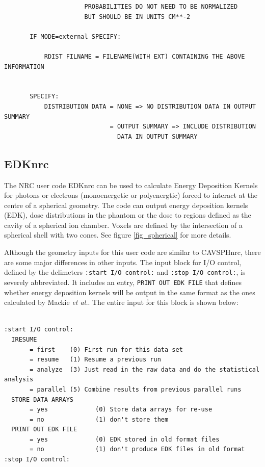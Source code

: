 \documentclass[12pt,twoside]{article}  %
\begin{document}
\begin{verbatim}
                      PROBABILITIES DO NOT NEED TO BE NORMALIZED
                      BUT SHOULD BE IN UNITS CM**-2

       IF MODE=external SPECIFY:

           RDIST FILNAME = FILENAME(WITH EXT) CONTAINING THE ABOVE INFORMATION


       SPECIFY:
           DISTRIBUTION DATA = NONE => NO DISTRIBUTION DATA IN OUTPUT SUMMARY
                             = OUTPUT SUMMARY => INCLUDE DISTRIBUTION
                               DATA IN OUTPUT SUMMARY
\end{verbatim}

\subsection{EDKnrc}

The NRC user code EDKnrc can be used to calculate Energy Deposition Kernels
for photons or electrons (monoenergetic or polyenergtic) forced to interact
at the centre of a spherical
geometry\cite{Ma05}.  The code can output energy deposition kernels (EDK),
dose distributions in the phantom or the dose to regions defined as the
cavity of a spherical ion chamber.  Voxels are defined by the intersection
of a spherical shell with two cones. See figure \ref{fig_spherical}
for more details.

Although the geometry inputs for this user code are similar to CAVSPHnrc,
there are some major differences in other inputs. The input block for I/O
control, defined by the delimeters {\tt :start I/O control:} and
{\tt:stop I/O control:}, is severely abbreviated.  It includes an entry,
{\tt PRINT OUT EDK FILE} that defines whether energy deposition
kernels will be output in the same format as the ones calculated by
Mackie {\it et al.}\cite{Ma88}. The entire input for this block
is shown below:

\begin{verbatim}

:start I/O control:
  IRESUME
       = first    (0) First run for this data set
       = resume   (1) Resume a previous run
       = analyze  (3) Just read in the raw data and do the statistical analysis
       = parallel (5) Combine results from previous parallel runs
  STORE DATA ARRAYS
       = yes             (0) Store data arrays for re-use
       = no              (1) don't store them
  PRINT OUT EDK FILE
       = yes             (0) EDK stored in old format files
       = no              (1) don't produce EDK files in old format
:stop I/O control:
\end{verbatim}
\end{document}
